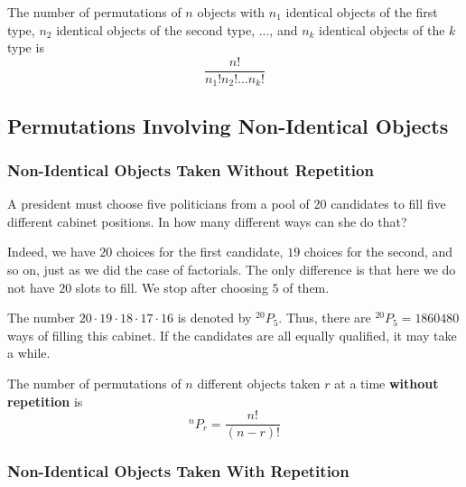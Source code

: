 \documentclass[11pt,a4paper]{book}
\begin{document}
\medskip{}

\begin{tcolorbox}[colback=blue!5, colframe=black, boxrule=.4pt, sharpish corners]

The number of permutations of $n$ objects with $n_{1}$ identical
objects of the first type, $n_{2}$ identical objects of the second
type, ..., and $n_{k}$ identical objects of the $k$ type is
\[
\frac{n!}{n_{1}!n_{2}!\ldots n_{k}!}
\]
\end{tcolorbox}


\subsection{Permutations Involving Non-Identical Objects}

\subsubsection{Non-Identical Objects Taken Without Repetition}

\begin{example}

A president must choose five politicians from a pool of 20 candidates
to fill five different cabinet positions. In how many different ways
can she do that?

\Solution

Indeed, we have $20$ choices for the first candidate, $19$ choices
for the second, and so on, just as we did the case of factorials.
The only difference is that here we do not have $20$ slots to fill.
We stop after choosing $5$ of them.

The number $20\cdot19\cdot18\cdot17\cdot16$ is denoted by $^{20}P_{5}$.
Thus, there are $^{20}P_{5}=1860480$ ways of filling this cabinet.
If the candidates are all equally qualified, it may take a while.

\end{example}

\medskip{}

\begin{tcolorbox}[colback=blue!5, colframe=black, boxrule=.4pt, sharpish corners]

The number of permutations of $n$ different objects taken $r$ at
a time \textbf{without repetition} is
\[
^{n}P_{r}=\frac{n!}{\left(n-r\right)!}
\]
\end{tcolorbox}


\subsubsection{Non-Identical Objects Taken With Repetition}
\end{document}
